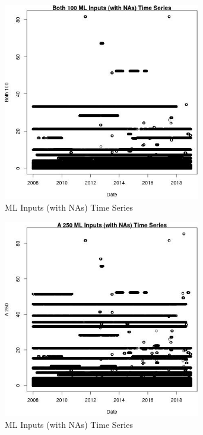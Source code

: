 \begin{figure} 
\centering  
\includegraphics[width=0.77\textwidth]{Code_Outputs/Report_ML_input_PM25_Step4_part_f_de_duplicated_aves_prioritize_24hr_obswNAs_Both_100vDate.jpg} 
\caption{\label{fig:Report_ML_input_PM25_Step4_part_f_de_duplicated_aves_prioritize_24hr_obswNAsBoth_100vDate}ML Inputs (with NAs) Time Series} 
\end{figure} 
 

\begin{figure} 
\centering  
\includegraphics[width=0.77\textwidth]{Code_Outputs/Report_ML_input_PM25_Step4_part_f_de_duplicated_aves_prioritize_24hr_obswNAs_A_250vDate.jpg} 
\caption{\label{fig:Report_ML_input_PM25_Step4_part_f_de_duplicated_aves_prioritize_24hr_obswNAsA_250vDate}ML Inputs (with NAs) Time Series} 
\end{figure} 
 

